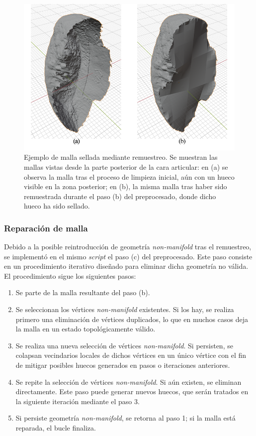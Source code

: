\begin{figure}[h]
    \centering
    \includegraphics[width=\linewidth]{figures/4_materials-methods/remesh_hole_filled_example.png}
    \caption[Ejemplo de malla sellada por remuestreo]{Ejemplo de malla sellada mediante remuestreo. Se muestran las mallas vistas desde la parte posterior de la cara articular: en (a) se observa la malla tras el proceso de limpieza inicial, aún con un hueco visible en la zona posterior; en (b), la misma malla tras haber sido remuestrada durante el paso (b) del preprocesado, donde dicho hueco ha sido sellado.}
    \label{remesh_hole_example}
\end{figure}

\subsubsection{Reparación de malla}
\label{section4:data_repair}
Debido a la posible reintroducción de geometría \textit{non-manifold} tras el remuestreo, se implementó en el mismo \textit{script} el paso (c) del preprocesado. Este paso consiste en un procedimiento iterativo diseñado para eliminar dicha geometría no válida. El procedimiento sigue los siguientes pasos:

\begin{enumerate}
    \item Se parte de la malla resultante del paso (b).
    \item Se seleccionan los vértices \textit{non-manifold} existentes. Si los hay, se realiza primero una eliminación de vértices duplicados, lo que en muchos casos deja la malla en un estado topológicamente válido.
    \item Se realiza una nueva selección de vértices \textit{non-manifold}. Si persisten, se colapsan vecindarios locales de dichos vértices en un único vértice con el fin de mitigar posibles huecos generados en pasos o iteraciones anteriores.
    \item Se repite la selección de vértices \textit{non-manifold}. Si aún existen, se eliminan directamente. Este paso puede generar nuevos huecos, que serán tratados en la siguiente iteración mediante el paso 3.
    \item Si persiste geometría \textit{non-manifold}, se retorna al paso 1; si la malla está reparada, el bucle finaliza.
\end{enumerate}

